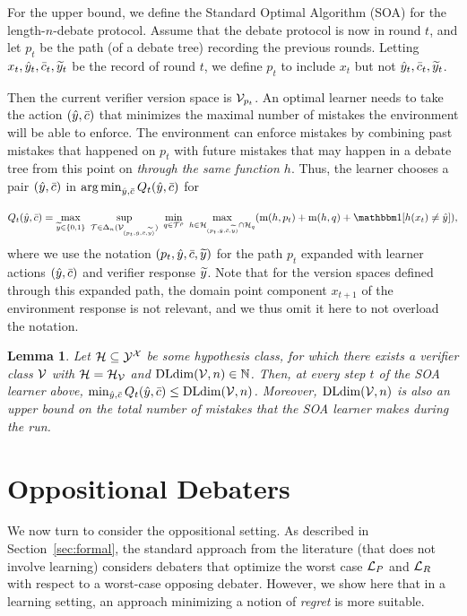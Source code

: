 \documentclass[11pt,letterpaper]{article}
\newtheorem{lemma}[theorem]{Lemma}
\theoremstyle{definition}
\theoremstyle{plain}
\DeclareMathOperator*{\argmin}{arg\,min}
\begin{document}
For the upper bound, we define the Standard Optimal Algorithm (SOA) for the length-$n$-debate protocol. Assume that the debate protocol is now in round $t$, and let $p_t$ be the path (of a debate tree) recording the previous rounds. Letting $x_t,{\hat{y}}_t,\bar{c}_t,{\widetilde{y}}_t$ be the record of round $t$, we define $p_t$ to include $x_t$ but not ${\hat{y}}_t,\bar{c}_t,{\widetilde{y}}_t$.


Then the current verifier version space is ${\mathcal V}_{p_t}$. 
An optimal learner needs to take the action $({\hat{y}}, \bar{c})$ that minimizes the maximal number of mistakes the environment will be able to enforce. The environment can enforce mistakes by combining past mistakes that happened on $p_t$ with future mistakes that may happen in a debate tree from this point on \emph{through the same function $h$}.
Thus, the learner chooses a pair $({\hat{y}}, \bar{c})$ in $\argmin_{\hy, \sc}Q_t(\hy, \sc)$ for

\[
Q_t(\hy, \sc) = \max_{\vy\in\{0,1\}} ~\sup_{\T\in\Delta_n(\V_{(p_t,\hy, \sc, \vy)})} ~\min_{q\in\T^\rho} ~\max_{h\in \H_{(p_t,\hy, \sc, \vy)}\cap \H_q} (\mi(h, p_t) + \mi(h,q) +\indct[h(x_t) \neq \hy]),
\]
where we use the notation $(p_t,{\hat{y}}, \bar{c}, {\widetilde{y}})$ for the path $p_t$ expanded with learner actions $({\hat{y}}, \bar{c})$ and verifier response ${\widetilde{y}}$. 
Note that for the version spaces defined through this expanded path, the domain point component $x_{t+1}$ of the  environment response is not relevant, and we thus omit it here to not overload the notation.

\begin{lemma}\label{lemma:cooperative_deterministic_upperbound}
 Let ${{\mathcal H}}\subseteq {\mathcal Y}^{\mathcal X}$ be some hypothesis class, for which there exists a verifier class ${\mathcal V}$ with ${{\mathcal H}} = {{\mathcal H}}_{\mathcal V}$ and $\mathrm{DLdim}({\mathcal V}, n) \in \mathbb{N}$. Then, at every step $t$ of the SOA learner above, $\min_{{\hat{y}},\bar{c}} Q_t({\hat{y}},\bar{c}) \leq \mathrm{DLdim}({\mathcal V}, n)$. 
  Moreover, $\mathrm{DLdim}({\mathcal V}, n)$ is also an upper bound on the total number of mistakes that the SOA learner makes during the run.
\end{lemma}





\section{Oppositional Debaters}
\label{sec:oppositional}

We now turn to consider the oppositional setting. As described in Section~\ref{sec:formal}, the standard approach from the literature (that does not involve learning) considers debaters that optimize the worst case ${{\mathcal L}_P}$ and ${{\mathcal L}_R}$ with respect to a worst-case opposing debater. However, we show here that in a learning setting, an approach minimizing a notion of \emph{regret} is more suitable. 
\end{document}
